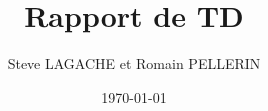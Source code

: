 \documentclass[11pt,a4paper,twoside,french,svgnames]{report}
\title{Rapport de TD}
\author{Steve LAGACHE et Romain PELLERIN}
\date\today
\begin{document}


\tableofcontents




\begin{appendices}

\end{appendices}
\end{document}
